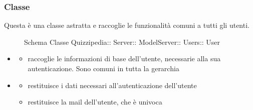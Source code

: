 \subsubsection{Classe }
Questa è una classe astratta e raccoglie le funzionalità comuni a tutti gli utenti.
\begin{figure}[H]
\centering
\noindent{}
\caption[Schema Classe User]{Schema Classe Quizzipedia:: Server:: ModelServer:: Users:: User}
\end{figure}
\begin{itemize}
\item {}
\begin{itemize}
\item {}
\newline
raccoglie le informazioni di base dell'utente, necessarie alla sua autenticazione. Sono comuni in tutta la gerarchia
\end{itemize}
\item {}
\begin{itemize}
\item {}
\newline
restituisce i dati necessari all'autenticazione dell'utente
\newline
\item {}
\newline
restituisce la mail dell'utente, che è univoca
\newline
\end{itemize}
\end{itemize}
